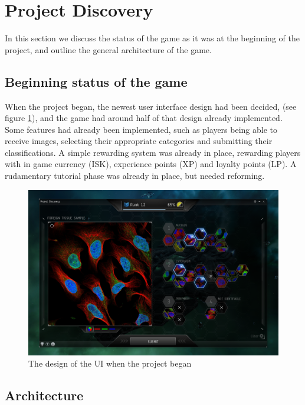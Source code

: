 \section{Project Discovery}\label{sec:project_discovery}
In this section we discuss the status of the game as it was at the beginning of the project, and outline the general architecture of the game.

\subsection{Beginning status of the game}
When the project began, the newest user interface design had been decided, (see figure \ref{fig:PD}), and the game had around half of that design already implemented. Some features had already been implemented, such as players being able to receive images, selecting their appropriate categories and submitting their classifications. A simple rewarding system was already in place, rewarding players with in game currency (ISK), experience points (XP) and loyalty points (LP). A rudamentary tutorial phase was already in place, but needed reforming.\\

\begin{figure}[H]
	\centering
	\graphicspath{ {./graphics/} }
    \centerline{\includegraphics[width=15cm]{PD.png}}
    \caption{\label{fig:PD}The design of the UI when the project began}
\end{figure}

\subsection{Architecture}
